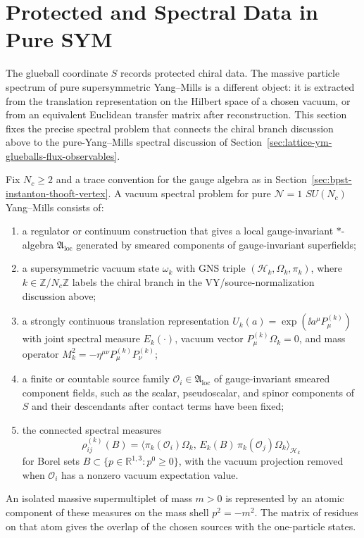 \section{Protected and Spectral Data in Pure SYM}
\label{sec:pure-sym-protected-spectral-data}

The glueball coordinate \(S\) records protected chiral data.  The massive
particle spectrum of pure supersymmetric Yang--Mills is a different object:
it is extracted from the translation representation on the Hilbert space of a
chosen vacuum, or from an equivalent Euclidean transfer matrix after
reconstruction.  This section fixes the precise spectral problem that connects the
chiral branch discussion above to the pure-Yang--Mills spectral discussion of
Section~\ref{sec:lattice-ym-glueballs-flux-observables}.

\begin{definition}
\label{def:pure-sym-vacuum-spectral-problem}
Fix \(N_c\ge2\) and a trace convention for the gauge algebra as in
Section~\ref{sec:bpst-instanton-thooft-vertex}.  A vacuum
spectral problem for pure \(\mathcal N=1\) \(SU(N_c)\) Yang--Mills consists of:
\begin{enumerate}[label=(\roman*)]
\item a regulator or continuum construction that gives a local
  gauge-invariant \(*\)-algebra \(\mathfrak A_{\mathrm{loc}}\) generated by
  smeared components of gauge-invariant superfields;
\item a supersymmetric vacuum state \(\omega_k\) with GNS triple
  \((\mathcal H_k,\Omega_k,\pi_k)\), where \(k\in\mathbb Z/N_c\mathbb Z\)
  labels the chiral branch in the VY/source-normalization discussion above;
\item a strongly continuous translation representation
  \(U_k(a)=\exp(\ii a^\mu P^{(k)}_\mu)\) with joint spectral measure
  \(E_k(\cdot)\), vacuum vector \(P^{(k)}_\mu\Omega_k=0\), and mass operator
  \(M_k^2=-\eta^{\mu\nu}P^{(k)}_\mu P^{(k)}_\nu\);
\item a finite or countable source family
  \(\mathcal O_i\in\mathfrak A_{\mathrm{loc}}\) of gauge-invariant smeared
  component fields, such as the scalar, pseudoscalar, and spinor components
  of \(S\) and their descendants after contact terms have been fixed;
\item the connected spectral measures
  \[
    \rho^{(k)}_{ij}(B)
    =
    \bigl\langle
      \pi_k(\mathcal O_i)\Omega_k,\,
      E_k(B)\,\pi_k(\mathcal O_j)\Omega_k
    \bigr\rangle_{\mathcal H_k}
  \]
  for Borel sets \(B\subset\{p\in\mathbb R^{1,3}:p^0\ge0\}\), with the
  vacuum projection removed when \(\mathcal O_i\) has a nonzero vacuum
  expectation value.
\end{enumerate}
An isolated massive supermultiplet of mass \(m>0\) is represented by an
atomic component of these measures on the mass shell \(p^2=-m^2\).  The
matrix of residues on that atom gives the overlap of the chosen sources with
the one-particle states.
\end{definition}

